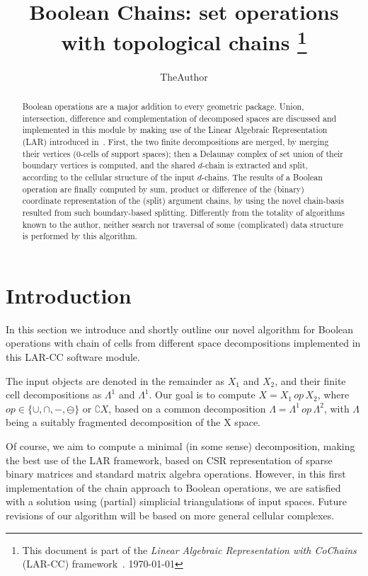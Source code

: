 \documentclass[11pt,oneside]{article}	%
\title{Boolean Chains: set operations with topological chains
\footnote{This document is part of the \emph{Linear Algebraic Representation with CoChains} (LAR-CC) framework~\cite{cclar-proj:2013:00}. \today}
}
\author{TheAuthor}
\begin{document}
\maketitle

\begin{abstract}
Boolean operations are a major addition to every geometric package. Union, intersection, difference and complementation of decomposed spaces are discussed and implemented in this module by making use of the Linear Algebraic Representation (LAR) introduced in~\cite{Dicarlo:2014:TNL:2543138.2543294}. First, the two finite decompositions are merged, by merging their vertices (0-cells of support spaces); then a Delaunay complex of set union of their boundary vertices is computed, and the shared $d$-chain is extracted and split, according to the cellular structure of the input $d$-chains. The results of a Boolean operation are finally computed by sum, product or difference of the (binary) coordinate representation of the (split) argument chains, by using the novel chain-basis resulted from such boundary-based splitting. Differently from the totality of algorithms known to the author, neither search nor traversal of some (complicated) data structure is performed by this algorithm. 
\end{abstract}

\tableofcontents
\section{Introduction}

In this section we introduce and shortly outline our novel algorithm for Boolean operations with chain of cells from different space decompositions implemented in this LAR-CC software module.

The input objects are denoted in the remainder as $X_1$ and $X_2$, and their finite cell decompositions as $\Lambda^1$ and $\Lambda^1$. Our goal is to compute $X = X_1\, op\, X_2$, where $op \in \{\cup ,\cap , - ,\ominus \}$ or $\complement X$, based on a common decomposition $\Lambda = \Lambda^1\, op\, \Lambda^2$, with $\Lambda$ being a suitably fragmented decomposition of the X space.

Of course, we aim to compute a minimal (in some sense) decomposition, making the best use of the LAR framework, based on CSR representation of sparse binary matrices and standard matrix algebra operations.
However, in this first implementation of the chain approach to Boolean operations, we are satisfied with a solution using (partial) simplicial triangulations of input spaces. Future revisions of our algorithm will be based on more general cellular complexes.
\end{document}
